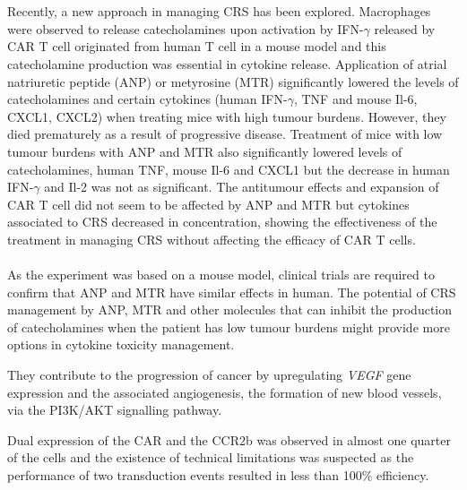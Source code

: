 \\\\Recently, a new approach in managing CRS has been explored. Macrophages were observed to release catecholamines upon activation by IFN-$\gamma$ released by CAR T cell originated from human T cell in a mouse model and this catecholamine production was essential in cytokine release\citep{CRS}. Application of atrial natriuretic peptide (ANP) or metyrosine (MTR) significantly lowered the levels of catecholamines and certain cytokines (human IFN-$\gamma$, TNF and mouse Il-6, CXCL1, CXCL2) when treating mice with high tumour burdens. However, they died prematurely as a result of progressive disease. Treatment of mice with low tumour burdens with ANP and MTR also significantly lowered levels of catecholamines, human TNF, mouse Il-6 and CXCL1 but the decrease in human IFN-$\gamma$ and Il-2 was not as significant. The antitumour effects and expansion of CAR T cell did not seem to be affected by ANP and MTR but cytokines associated to CRS decreased in concentration, showing the effectiveness of the treatment in managing CRS without affecting the efficacy of CAR T cells. 
\\\\As the experiment was based on a mouse model, clinical trials are required to confirm that ANP and MTR have similar effects in human. The potential of CRS management by ANP, MTR and other molecules that can inhibit the production of catecholamines when the patient has low tumour burdens might provide more options in cytokine toxicity management.

They contribute to the progression of cancer by upregulating \textit{VEGF} gene expression and the associated angiogenesis, the formation of new blood vessels, via the PI3K/AKT signalling pathway\citep{MMP2-VEGF, MMP2-VEGF2, MMP9}. 

Dual expression of the CAR and the CCR2b was observed in almost one quarter of the cells and the existence of technical limitations was suspected as the performance of two transduction events resulted in less than 100$\%$ efficiency\citep{CCR2}.